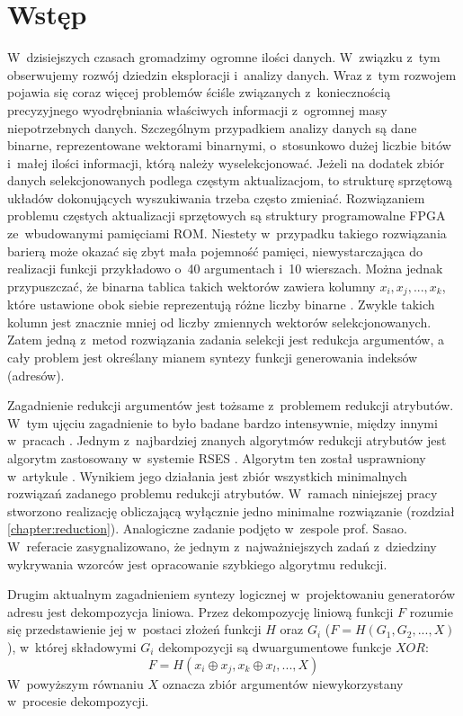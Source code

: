 \chapter{Wstęp}

W~dzisiejszych czasach gromadzimy ogromne ilości danych.
W~związku z~tym obserwujemy rozwój dziedzin eksploracji i~analizy danych.
Wraz z~tym rozwojem pojawia się coraz więcej problemów ściśle związanych z~koniecznością precyzyjnego wyodrębniania właściwych informacji z~ogromnej masy niepotrzebnych danych.
Szczególnym przypadkiem analizy danych są dane binarne, reprezentowane wektorami binarnymi, o~stosunkowo dużej liczbie bitów i~małej ilości informacji,
którą należy wyselekcjonować.
Jeżeli na dodatek zbiór danych selekcjonowanych podlega częstym aktualizacjom,
to strukturę sprzętową układów dokonujących wyszukiwania trzeba często zmieniać.
Rozwiązaniem problemu częstych aktualizacji sprzętowych są struktury programowalne FPGA ze~wbudowanymi pamięciami ROM.
Niestety w~przypadku takiego rozwiązania barierą może okazać się zbyt mała pojemność pamięci,
niewystarczająca do realizacji funkcji przykładowo o~40 argumentach i~10 wierszach.
Można jednak przypuszczać, że binarna tablica takich wektorów zawiera kolumny $x_i, x_j, ..., x_k$,
które ustawione obok siebie reprezentują różne liczby binarne \cite{sasao-workshop}.
Zwykle takich kolumn jest znacznie mniej od liczby zmiennych wektorów selekcjonowanych.
Zatem jedną z~metod rozwiązania zadania selekcji jest redukcja argumentów,
a cały problem jest określany mianem syntezy funkcji generowania indeksów (adresów).

Zagadnienie redukcji argumentów jest tożsame z~problemem redukcji atrybutów.
W~tym ujęciu zagadnienie to było badane bardzo intensywnie, między innymi w~pracach \cite{fast-algorithm, efektywna-procedura, new-reduction, steinbach-posthoff, skowron-rauszer, slezak, novel-method}.
Jednym z~najbardziej znanych algorytmów redukcji atrybutów jest algorytm zastosowany w~systemie RSES \cite{rses}.
Algorytm ten został usprawniony w~artykule \cite{efektywna-procedura}.
Wynikiem jego działania jest zbiór wszystkich minimalnych rozwiązań zadanego problemu redukcji atrybutów.
W~ramach niniejszej pracy stworzono realizację obliczającą wyłącznie jedno minimalne rozwiązanie (rozdział \ref{chapter:reduction}).
Analogiczne zadanie podjęto w~zespole prof. Sasao.
W~referacie \cite{sasao-workshop} zasygnalizowano,
że jednym z~najważniejszych zadań z~dziedziny wykrywania wzorców jest opracowanie szybkiego algorytmu redukcji.

Drugim aktualnym zagadnieniem syntezy logicznej w~projektowaniu generatorów adresu jest dekompozycja liniowa.
Przez dekompozycję liniową funkcji $F$ rozumie się przedstawienie jej w~postaci złożeń funkcji $H$ oraz $G_i$ ($F = H(G_1, G_2, ...,  X)$),
w~której składowymi $G_i$ dekompozycji są dwuargumentowe funkcje $XOR$:
\begin{equation}
F = H (x_i \oplus x_j, x_k \oplus x_l, ..., X)
\end{equation}
W~powyższym równaniu $X$ oznacza zbiór argumentów niewykorzystany w~procesie dekompozycji.

